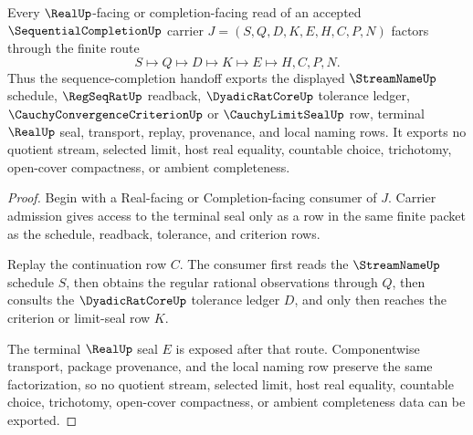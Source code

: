 \begin{theorem}
\label{thm:sequential-completion-regseqrat-real-handoff}
Every $\RealUp$-facing or completion-facing read of an accepted $\SequentialCompletionUp$ carrier $J=(S,Q,D,K,E,H,C,P,N)$ factors through the finite route
$$
S \longmapsto Q \longmapsto D \longmapsto K \longmapsto E \longmapsto H,C,P,N .
$$
Thus the sequence-completion handoff exports the displayed $\StreamNameUp$ schedule, $\RegSeqRatUp$ readback, $\DyadicRatCoreUp$ tolerance ledger, $\CauchyConvergenceCriterionUp$ or $\CauchyLimitSealUp$ row, terminal $\RealUp$ seal, transport, replay, provenance, and local naming rows. It exports no quotient stream, selected limit, host real equality, countable choice, trichotomy, open-cover compactness, or ambient completeness.
\end{theorem}
\begin{proof}
Begin with a Real-facing or Completion-facing consumer of $J$. Carrier admission gives access to the terminal seal only as a row in the same finite packet as the schedule, readback, tolerance, and criterion rows.

Replay the continuation row $C$. The consumer first reads the $\StreamNameUp$ schedule $S$, then obtains the regular rational observations through $Q$, then consults the $\DyadicRatCoreUp$ tolerance ledger $D$, and only then reaches the criterion or limit-seal row $K$.

The terminal $\RealUp$ seal $E$ is exposed after that route. Componentwise transport, package provenance, and the local naming row preserve the same factorization, so no quotient stream, selected limit, host real equality, countable choice, trichotomy, open-cover compactness, or ambient completeness data can be exported.
\end{proof}

